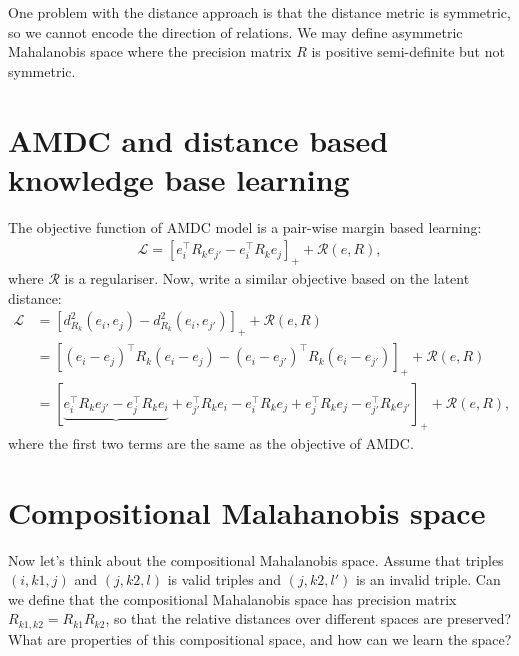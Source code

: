 \documentclass{article}
\theoremstyle{definition}
\begin{document}
One problem with the distance approach is that the distance metric is symmetric, so we cannot encode the direction of relations. We may define asymmetric Mahalanobis space where the precision matrix $R$ is positive semi-definite but not symmetric.

\section{AMDC and distance based knowledge base learning}

The objective function of AMDC model is a pair-wise margin based learning:
\begin{align}
\mathcal{L} = [e_i^\top R_k e_{j'} - e_i^\top R_k e_j]_{+} + \mathcal{R}(e, R),
\end{align}
where $\mathcal{R}$ is a regulariser.
Now, write a similar objective based on the latent distance:
\begin{align}
\mathcal{L} &= [d_{R_k}^2(e_i, e_j) - d_{R_k}^2(e_i, e_{j'})]_{+} + \mathcal{R}(e, R) \\
&= [(e_i - e_{j})^\top R_k (e_i - e_{j}) - (e_i - e_{j'})^\top R_k (e_i - e_{j'})]_{+} + \mathcal{R}(e, R) \\
&= [\underbrace{e_i^\top R_k e_{j'} - e_{j}^\top R_k e_i} 
+ e_{j'}^\top R_k e_{i} - e_{i}^\top R_k e_{j} 
+ e_{j}^\top R_k e_{j} - e_{j'}^\top R_k e_{j'} ]_{+}  
+ \mathcal{R}(e, R) ,
\end{align}
where the first two terms are the same as the objective of AMDC.

\section{Compositional Malahanobis space}

Now let's think about the compositional Mahalanobis space. Assume that triples $(i, k1, j)$ and $(j, k2, l)$ is valid triples and $(j, k2, l')$ is an invalid triple. Can we define that the compositional Mahalanobis space has precision matrix $R_{k1,k2} = R_{k1} R_{k2}$, so that the relative distances over different spaces are preserved? What are properties of this compositional space, and how can we learn the space?

\end{document}
